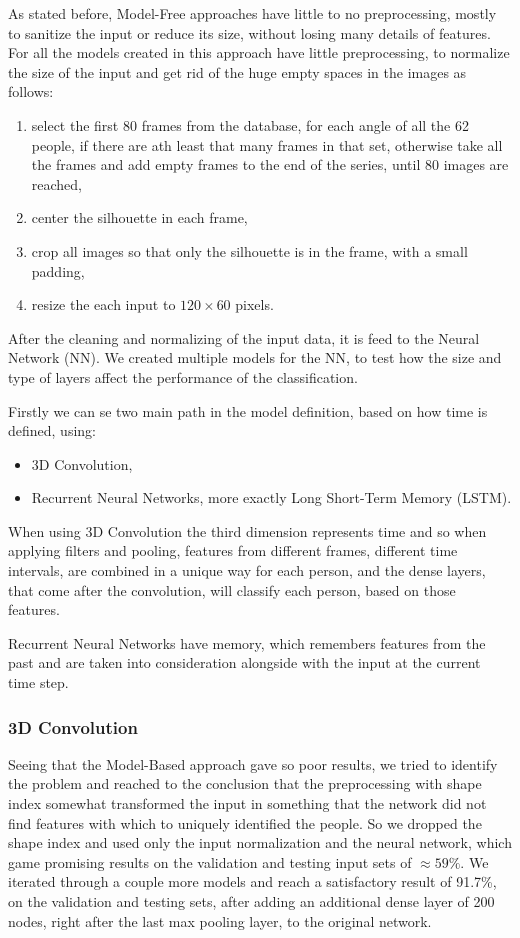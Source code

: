 \documentclass[12pt]{article}
\theoremstyle{definition}
\begin{document}
	As stated before, Model-Free approaches have little to no preprocessing, mostly to sanitize the input or reduce its size, without losing many details of features. For all the models created in this approach have little preprocessing, to normalize the size of the input and get rid of the huge empty spaces in the images as follows:
	\begin{enumerate}
		\item select the first 80 frames from the database, for each angle of all the 62 people, if there are ath least that many frames in that set, otherwise take all the frames and add empty frames to the end of the series, until 80 images are reached,
		\item center the silhouette in each frame,
		\item crop all images so that only the silhouette is in the frame, with a small padding,
		\item resize the each input to $120 \times 60$ pixels.
	\end{enumerate}

	After the cleaning and normalizing of the input data, it is feed to the Neural Network (NN). We created multiple models for the NN, to test how the size and type of layers affect the performance of the classification.

	Firstly we can se two main path in the model definition, based on how time is defined, using:
	\begin{itemize}
		\item 3D Convolution,
		\item Recurrent Neural Networks, more exactly Long Short-Term Memory (LSTM).
	\end{itemize}

	When using 3D Convolution the third dimension represents time and so when applying filters and pooling, features from different frames, different time intervals, are combined in a unique way for each person, and the dense layers, that come after the convolution, will classify each person, based on those features.

	Recurrent Neural Networks have memory, which remembers features from the past and are taken into consideration alongside with the input at the current time step.

	\subsubsection{3D Convolution}

	Seeing that the Model-Based approach gave so poor results, we tried to identify the problem and reached to the conclusion that the preprocessing with shape index somewhat transformed the input in something that the network did not find features with which to uniquely identified the people. So we dropped the shape index and used only the input normalization and the neural network, which game promising results on the validation and testing input sets of $\approx 59\%$. We iterated through a couple more models and reach a satisfactory result of 91.7\%, on the validation and testing sets, after adding an additional dense layer of 200 nodes, right after the last max pooling layer, to the original network.
\end{document}
